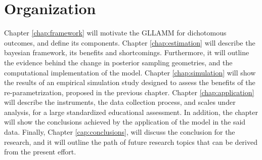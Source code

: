 \section{Organization}

Chapter \ref{chap:framework} will motivate the GLLAMM for dichotomous outcomes, and define its components. Chapter \ref{chap:estimation} will describe the bayesian framework, its benefits and shortcomings. Furthermore, it will outline the evidence behind the change in posterior sampling geometries, and the computational implementation of the model. Chapter \ref{chap:simulation} will show the results of an empirical simulation study designed to assess the benefits of the re-parametrization, proposed in the previous chapter. Chapter \ref{chap:application} will describe the instruments, the data collection process, and scales under analysis, for a large standardized educational assessment. In addition, the chapter will show the conclusions achieved by the application of the model in the said data. Finally, Chapter \ref{cap:conclusions}, will discuss the conclusion for the research, and it will outline the path of future research topics that can be derived from the present effort.
